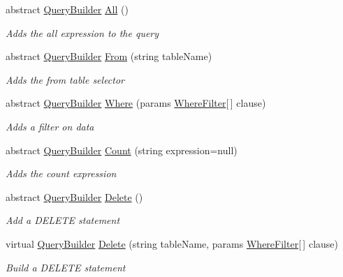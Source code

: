 \begin{DoxyCompactItemize}
abstract \hyperlink{class_o_t_a_1_1_data_1_1_query_builder}{Query\+Builder} \hyperlink{class_o_t_a_1_1_data_1_1_query_builder_a7e58fc94d8fd3dfa3df74e0ca3f598eb}{All} ()
\begin{DoxyCompactList}\small\item\em Adds the all expression to the query \end{DoxyCompactList}\item 
abstract \hyperlink{class_o_t_a_1_1_data_1_1_query_builder}{Query\+Builder} \hyperlink{class_o_t_a_1_1_data_1_1_query_builder_a61572a8686ca7e883c52ac56ae6fceeb}{From} (string table\+Name)
\begin{DoxyCompactList}\small\item\em Adds the from table selector \end{DoxyCompactList}\item 
abstract \hyperlink{class_o_t_a_1_1_data_1_1_query_builder}{Query\+Builder} \hyperlink{class_o_t_a_1_1_data_1_1_query_builder_a865c74a43cd89625e13e38fe09196d31}{Where} (params \hyperlink{struct_o_t_a_1_1_data_1_1_where_filter}{Where\+Filter}\mbox{[}$\,$\mbox{]} clause)
\begin{DoxyCompactList}\small\item\em Adds a filter on data \end{DoxyCompactList}\item 
abstract \hyperlink{class_o_t_a_1_1_data_1_1_query_builder}{Query\+Builder} \hyperlink{class_o_t_a_1_1_data_1_1_query_builder_a533f3fd30813def9abd8c09db7dbcc24}{Count} (string expression=null)
\begin{DoxyCompactList}\small\item\em Adds the count expression \end{DoxyCompactList}\item 
abstract \hyperlink{class_o_t_a_1_1_data_1_1_query_builder}{Query\+Builder} \hyperlink{class_o_t_a_1_1_data_1_1_query_builder_a200bcf600ef6769632e93e0961bdb9db}{Delete} ()
\begin{DoxyCompactList}\small\item\em Add a D\+E\+L\+E\+T\+E statement \end{DoxyCompactList}\item 
virtual \hyperlink{class_o_t_a_1_1_data_1_1_query_builder}{Query\+Builder} \hyperlink{class_o_t_a_1_1_data_1_1_query_builder_aa9ae45c66fc0447c929c6cef17b979a7}{Delete} (string table\+Name, params \hyperlink{struct_o_t_a_1_1_data_1_1_where_filter}{Where\+Filter}\mbox{[}$\,$\mbox{]} clause)
\begin{DoxyCompactList}\small\item\em Build a D\+E\+L\+E\+T\+E statement \end{DoxyCompactList}\item 

\end{DoxyCompactItemize}

